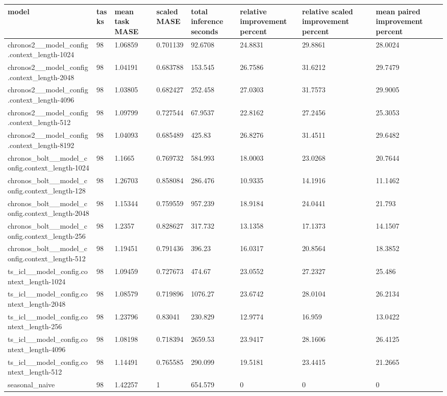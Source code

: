 \begin{tabular}{llllllll}
\toprule
model & tasks & mean task MASE & scaled MASE & total inference seconds & relative improvement percent & relative scaled improvement percent & mean paired improvement percent \\
\midrule
chronos2\_\_model\_config.context\_length-1024 & 98 & 1.06859 & 0.701139 & 92.6708 & 24.8831 & 29.8861 & 28.0024 \\
chronos2\_\_model\_config.context\_length-2048 & 98 & 1.04191 & 0.683788 & 153.545 & 26.7586 & 31.6212 & 29.7479 \\
chronos2\_\_model\_config.context\_length-4096 & 98 & 1.03805 & 0.682427 & 252.458 & 27.0303 & 31.7573 & 29.9005 \\
chronos2\_\_model\_config.context\_length-512 & 98 & 1.09799 & 0.727544 & 67.9537 & 22.8162 & 27.2456 & 25.3053 \\
chronos2\_\_model\_config.context\_length-8192 & 98 & 1.04093 & 0.685489 & 425.83 & 26.8276 & 31.4511 & 29.6482 \\
chronos\_bolt\_\_model\_config.context\_length-1024 & 98 & 1.1665 & 0.769732 & 584.993 & 18.0003 & 23.0268 & 20.7644 \\
chronos\_bolt\_\_model\_config.context\_length-128 & 98 & 1.26703 & 0.858084 & 286.476 & 10.9335 & 14.1916 & 11.1462 \\
chronos\_bolt\_\_model\_config.context\_length-2048 & 98 & 1.15344 & 0.759559 & 957.239 & 18.9184 & 24.0441 & 21.793 \\
chronos\_bolt\_\_model\_config.context\_length-256 & 98 & 1.2357 & 0.828627 & 317.732 & 13.1358 & 17.1373 & 14.1507 \\
chronos\_bolt\_\_model\_config.context\_length-512 & 98 & 1.19451 & 0.791436 & 396.23 & 16.0317 & 20.8564 & 18.3852 \\
ts\_icl\_\_model\_config.context\_length-1024 & 98 & 1.09459 & 0.727673 & 474.67 & 23.0552 & 27.2327 & 25.486 \\
ts\_icl\_\_model\_config.context\_length-2048 & 98 & 1.08579 & 0.719896 & 1076.27 & 23.6742 & 28.0104 & 26.2134 \\
ts\_icl\_\_model\_config.context\_length-256 & 98 & 1.23796 & 0.83041 & 230.829 & 12.9774 & 16.959 & 13.0422 \\
ts\_icl\_\_model\_config.context\_length-4096 & 98 & 1.08198 & 0.718394 & 2659.53 & 23.9417 & 28.1606 & 26.4125 \\
ts\_icl\_\_model\_config.context\_length-512 & 98 & 1.14491 & 0.765585 & 290.099 & 19.5181 & 23.4415 & 21.2665 \\
seasonal\_naive & 98 & 1.42257 & 1 & 654.579 & 0 & 0 & 0 \\
\bottomrule
\end{tabular}
